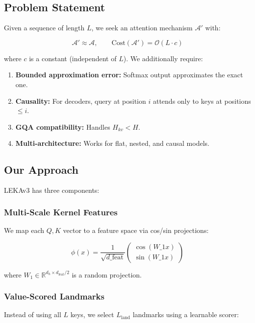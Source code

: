 \subsection{Problem Statement}

Given a sequence of length $L$, we seek an attention mechanism $\mathcal{A}'$ 
with:

\[
\mathcal{A}' \approx \mathcal{A}, \qquad
\text{Cost}(\mathcal{A}') = \mathcal{O}(L \cdot c)
\tag{1.3}
\]

where $c$ is a constant (independent of $L$). We additionally require:

\begin{enumerate}
\item \textbf{Bounded approximation error:} Softmax output approximates the exact one.
\item \textbf{Causality:} For decoders, query at position $i$ attends only to keys
  at positions $\leq i$.
\item \textbf{GQA compatibility:} Handles $H_{kv} < H$.
\item \textbf{Multi-architecture:} Works for flat, nested, and causal models.

\end{enumerate}
\subsection{Our Approach}

LEKAv3 has three components:

\subsubsection{Multi-Scale Kernel Features}

We map each $Q, K$ vector to a feature space via cos/sin projections:

\[
\phi(x) = \frac{1}{\sqrt{d\_\text{feat}}} \begin{pmatrix} \cos(W\_1 x) \\ \sin(W\_1 x) \end{pmatrix}
\tag{1.4}
\]

where $W_1 \in \mathbb{R}^{d_h \times d_\text{feat}/2}$ is a random projection.

\subsubsection{Value-Scored Landmarks}

Instead of using all $L$ keys, we select $L_\text{land}$ landmarks using a 
learnable scorer:

